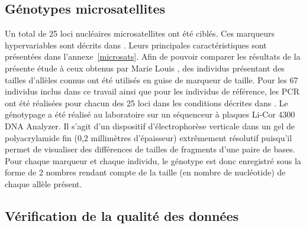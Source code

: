 \documentclass[a4paper,12pt,twoside]{article}\usepackage[]{graphicx}\usepackage[]{color}
\begin{document}
\subsection{Génotypes microsatellites}
Un total de 25 loci nucléaires microsatellites ont été ciblés. Ces marqueurs hypervariables sont décrits dans \citet{louis2014}. Leurs principales caractéristiques sont présentées dans l'annexe~\ref{microsats}. Afin de pouvoir comparer les résultats de la présente étude à ceux obtenus par Marie Louis \citep{louis2014}, des individus présentant des tailles d'allèles connus ont été utilisés en guise de marqueur de taille. Pour les 67 individus inclus dans ce travail ainsi que pour les individus de référence, les PCR ont été réalisées pour chacun des 25 loci dans les conditions décrites dans \citet{louis2014}. Le génotypage a été réalisé au laboratoire sur un séquenceur à plaques Li-Cor 4300 DNA Analyzer. Il s'agit d'un dispositif d'électrophorèse verticale dans un gel de polyacrylamide fin (0,2 millimètres d'épaisseur) extrêmement résolutif puisqu'il permet de visualiser des différences de tailles de fragments d'une paire de bases. Pour chaque marqueur et chaque individu, le génotype est donc enregistré sous la forme de 2 nombres rendant compte de la taille (en nombre de nucléotide) de chaque allèle présent.


\subsection{Vérification de la qualité des données}
\end{document}
